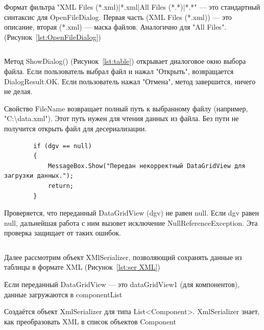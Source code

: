 \documentclass[12pt]{article}
\renewcommand{\texttt}[1]{{\small\ttfamily #1}}
\numberwithin{listing}{section}
\numberwithin{figure}{section}
\begin{document}
Формат фильтра "XML Files (*.xml)|*.xml|All Files (*.*)|*.*" — это стандартный синтаксис для \texttt{OpenFileDialog}. Первая часть (XML Files (*.xml)) — это описание, вторая (*.xml) — маска файлов. Аналогично для "All Files". (Рисунок~\ref{lst:OpenFileDialog})

\begin{listing}[H]
	\inputminted[firstline = 474, lastline=482]{csharp}{../../2lab/WinFormsApp1example_/Form1.cs}
	\label{lst:table}
\end{listing}

Метод \texttt{ShowDialog()} (Рисунок~\ref{lst:table}) открывает диалоговое окно выбора файла. Если пользователь выбрал файл и нажал "Открыть", возвращается \texttt{DialogResult.OK}. Если пользователь нажал "Отмена", метод завершится, ничего не делая.

Свойство \texttt{FileName} возвращает полный путь к выбранному файлу (например, "\texttt{C:\textbackslash data.xml}"). Этот путь нужен для чтения данных из файла. Без пути не получится открыть файл для десериализации.

\begin{listing}
	\begin{verbatim}
        if (dgv == null)
        {
            MessageBox.Show("Передан некорректный DataGridView для загрузки данных.");
            return;
        }
    \end{verbatim}
\end{listing}


Проверяется, что переданный \texttt{DataGridView} \texttt{(dgv)} не равен \texttt{null}. Если \texttt{dgv} равен \texttt{null}, дальнейшая работа с ним вызовет исключение \texttt{NullReferenceException}. Эта проверка защищает от таких ошибок.

\begin{listing}[H]
	\inputminted[firstline = 485, lastline=493]{csharp}{../../2lab/WinFormsApp1example_/Form1.cs}
	\label{lst:ser XML}
\end{listing}

Далее рассмотрим объект \texttt{XMlSerializer}, позволяющий сохранять данные из таблицы в формате XML (Рисунок~\ref{lst:ser XML})

Если переданный \texttt{DataGridView} — это \texttt{dataGridView1} (для компонентов), данные загружаются в \texttt{componentList}

Создаётся объект \texttt{XmlSerializer} для типа \texttt{List<Component>}. \texttt{XmlSerializer} знает, как преобразовать XML в список объектов \texttt{Component}
\end{document}
